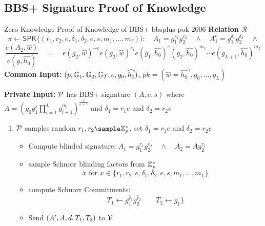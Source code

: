 {\newpage
% 
% 





\newpage
\subsection{\cite{hutchison_constant-size_2006} BBS+ Signature Proof of Knowledge}
\begin{protocol}{\cite{hutchison_constant-size_2006} Zero-Knowledge Proof of Knowledge of BBS+ }{bbsplus-pok-2006}
    \textbf{Relation $\mathcal{R}$}
        \[
        \pi \gets \mathsf{SPK}\{(r_1, r_2, e, \delta_1, \delta_2, e, s, m_1,\ldots,m_{\ell})): \quad A_1 = g_1^{r_1}g_2^{r_2} \quad \wedge \quad A_1^e = g_1^{\delta_1}g_2^{\delta_2} \quad \wedge 
        \]
        \[
        \frac{e(A_2, \widehat{w})}{e(g, \widehat{h_0})} \quad = \quad 
        e(g_2,\widehat{w})^{-e}e(g_2,\widehat{w})^{r_1}e(g_1,\widehat{h_0})^e(g_2,\widehat{h_0})^{m_1}\cdots e(g_{L+1},\widehat{h_0})^{m_L}
        \]
    \textbf{Common Input:} $(p, \mathbb{G}_1, \mathbb{G}_2, \mathbb{G}_T, e, g_0, \widehat{h_0})$, $pk = (\hat{w} = \hat{h_0}^{\gamma},  g_0, \ldots, g_{L})$

    \textbf{Private Input:} $\mathcal{P}$ has BBS+ signature $(A,e,s)$ where $A = (g_0g_1^s\prod_{i=1}^{L} g_{i+1}^{m_i})^{\frac{1}{e+\gamma}}$ and $\delta_1 = r_1e$ and $\delta_2 = r_2e$

    \vspace{1em}
    \begin{enumerate}
        \item $\mathcal{P}$ samples random $r_1, r_2 \sample \Z_p^*$, set $\delta_1 = r_1e$ and $\delta_2 = r_2e$
         \begin{itemize}
        \item Compute blinded signature: $A_1 = g_1^{r_1}g_2^{r_2} \quad \wedge \quad A_2 = Ag_2^{r_1}$

        \item sample Schnorr blinding factors from $\mathbb{Z}_p^*$
         \[
         \tilde{x} \text{ for } x \in \{r_1, r_2, e, \delta_1, \delta_2, e, s, m_1,\ldots,m_{L}\}
         \]

        \item compute Schnorr Commitments:
        \[
        T_1 \gets g_1^{\tilde{r_1}}g_2^{\tilde{r_2}} \qquad T_2 \gets g_1^{}\}
        \]
        
        \item  Send $(A', \Bar{A}, d, T_1, T_2)$ to $\mathcal{V}$
                

\end{itemize}
\end{enumerate}
\end{protocol}}
